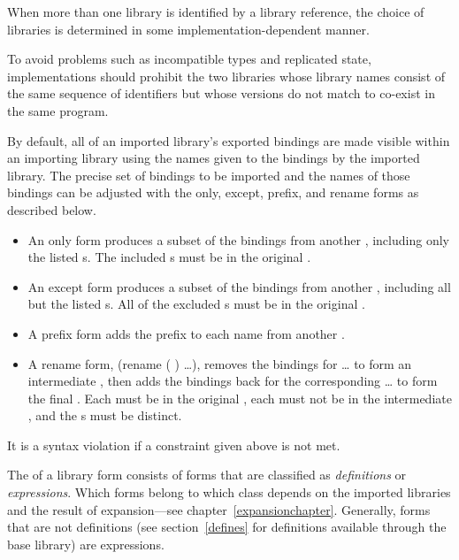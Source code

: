 When more than one library is identified by a library reference, the
choice of libraries is determined in some implementation-dependent manner.

To avoid problems such as incompatible types and replicated state,
implementations should prohibit the two libraries whose library names
consist of the same sequence of identifiers but whose versions do not
match to co-exist in the same program.

By default, all of an imported library's exported bindings are made
visible within an importing library using the names given to the bindings
by the imported library.
The precise set of bindings to be imported and the names of those
bindings can be adjusted with the {\cf only}, {\cf except},
{\cf prefix}, and {\cf rename} forms as described below.

\begin{itemize}
\item An {\cf only} form produces a subset of the bindings from another
, including only the listed
s.
The included s must be in
the original .
\item An {\cf except} form produces a subset of the bindings from another
, including all but the listed
s.
All of the excluded s must be in
the original .
\item A {\cf prefix} form adds the  prefix to each
name from another .
\item A {\cf rename} form, {\cf (rename ( ) \ldots)},
removes the bindings for {\cf {} \ldots} to form an
intermediate , then adds the bindings back for the
corresponding {\cf {} \ldots} to form the final
.
Each  must be in the original ,
each  must not be in the intermediate ,
and the s must be distinct.
\end{itemize}
It is a syntax violation if a constraint given above is not met.

\label{librarybodysection}
The  of a {\cf library} form consists of forms
that are classified as 
\textit{definitions} or
\textit{expressions}.  Which forms belong to
which class depends on the imported libraries and the result of
expansion---see chapter~\ref{expansionchapter}.  Generally, forms that
are not 
definitions (see section~\ref{defines} for definitions available
through the base library) are expressions.

